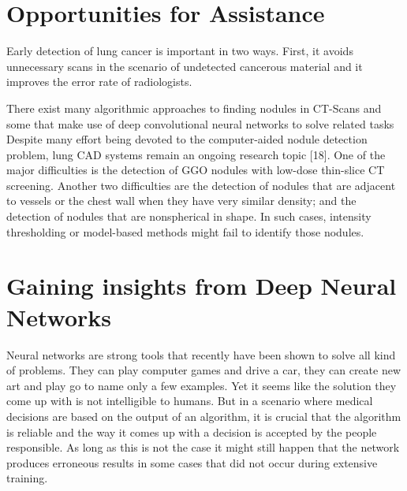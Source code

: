 \documentclass[main.tex]{subfiles}
\begin{document}
\section{Opportunities for Assistance}

Early detection of lung cancer is important in two ways. First, it avoids unnecessary scans in the scenario of undetected cancerous material and it improves the error rate of radiologists.

There exist many algorithmic approaches to finding nodules in CT-Scans \cite{papers_classical} and some that make use of deep convolutional neural networks to solve related tasks \cite{papers_dnn}\\

Despite many effort being devoted to the computer-aided nodule detection problem, lung CAD systems remain an ongoing
research topic [18]. One of the major difficulties is the detection of GGO nodules with low-dose thin-slice CT screening. Another two difficulties are the detection of nodules that are adjacent to vessels or the chest wall when they have very similar density; and the detection of nodules that are nonspherical in shape. In such cases, intensity thresholding or model-based methods might fail to identify those nodules.

\section{Gaining insights from Deep Neural Networks}
Neural networks are strong tools that recently have been shown to solve all kind of problems. They can play computer games and drive a car, they can create new art and play go to name only a few examples. Yet it seems like the solution they come up with is not intelligible to humans. But in a scenario where medical decisions are based on the output of an algorithm, it is crucial that the algorithm is reliable and the way it comes up with a decision is accepted by the people responsible. As long as this is not the case it might still happen that the network produces erroneous results in some cases that did not occur during extensive training.
\end{document}
